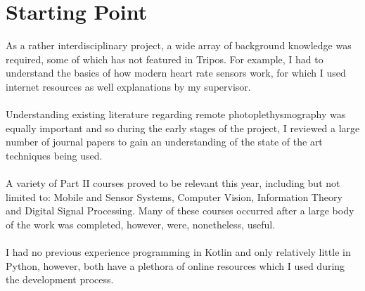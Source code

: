 \section{Starting Point}
As a rather interdisciplinary project, a wide array of background knowledge was required, some of which has not featured in Tripos.
For example, I had to understand the basics of how modern heart rate sensors work, for which I used internet resources as well explanations by my supervisor.
\\\\
Understanding existing literature regarding remote photoplethysmography was equally important and so during the early stages of the project, I reviewed
a large number of journal papers to gain an understanding of the state of the art techniques being used.
\\\\
A variety of Part II courses proved to be relevant this year, including but not limited to: Mobile and Sensor Systems, Computer Vision, Information Theory and Digital Signal Processing. Many of these courses occurred after a large body of the work was completed, however, were, nonetheless, useful.
\\\\
I had no previous experience programming in Kotlin and only relatively little in Python, however, both have a plethora of online resources which I used 
during the development process.